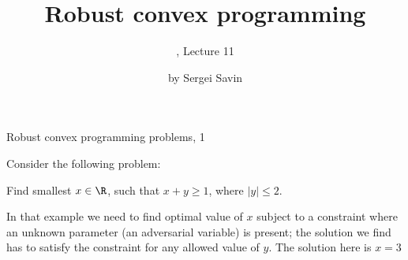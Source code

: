 \documentclass{beamer}
\title{ Robust convex programming }
\subtitle{\mycoursetitle, Lecture 11}
\author{by Sergei Savin}
\date{\mydate}
\begin{document}
\maketitle



%
%



\begin{frame}{Robust convex programming problems, 1}
\begin{flushleft}

Consider the following problem: 

\begin{example}
Find smallest $x \in \R$, such that $x + y \geq 1$, where $|y| \leq 2$.
\end{example}

\bigskip

In that example we need to find optimal value of $x$ subject to a constraint where an unknown parameter (an adversarial variable) is present; the solution we find has to satisfy the constraint for any allowed value of $y$. The solution here is $x = 3$

 
\end{flushleft}
\end{frame}
\end{document}
